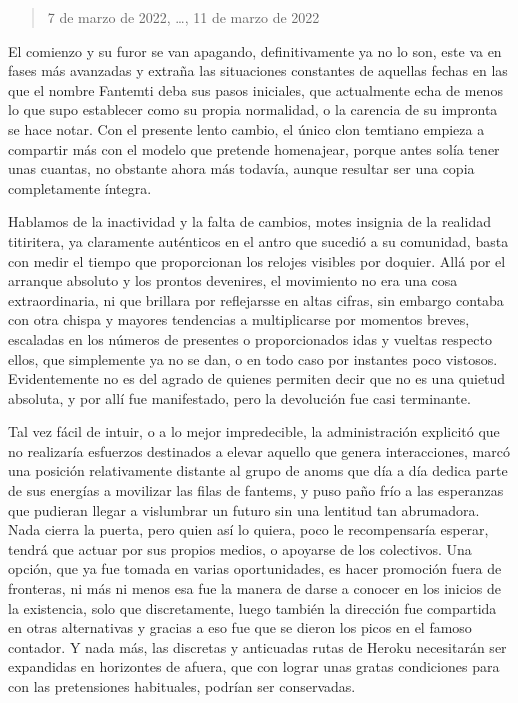 \documentclass[
]{book}
\begin{document}
\begin{quote}
7 de marzo de 2022, \ldots, 11 de marzo de 2022
\end{quote}

El comienzo y su furor se van apagando, definitivamente ya no lo son, este va en fases más avanzadas y extraña las situaciones constantes de aquellas fechas en las que el nombre Fantemti deba sus pasos iniciales, que actualmente echa de menos lo que supo establecer como su propia normalidad, o la carencia de su impronta se hace notar. Con el presente lento cambio, el único clon temtiano empieza a compartir más con el modelo que pretende homenajear, porque antes solía tener unas cuantas, no obstante ahora más todavía, aunque resultar ser una copia completamente íntegra.

Hablamos de la inactividad y la falta de cambios, motes insignia de la realidad titiritera, ya claramente auténticos en el antro que sucedió a su comunidad, basta con medir el tiempo que proporcionan los relojes visibles por doquier. Allá por el arranque absoluto y los prontos devenires, el movimiento no era una cosa extraordinaria, ni que brillara por reflejarsse en altas cifras, sin embargo contaba con otra chispa y mayores tendencias a multiplicarse por momentos breves, escaladas en los números de presentes o proporcionados idas y vueltas respecto ellos, que simplemente ya no se dan, o en todo caso por instantes poco vistosos. Evidentemente no es del agrado de quienes permiten decir que no es una quietud absoluta, y por allí fue manifestado, pero la devolución fue casi terminante.

Tal vez fácil de intuir, o a lo mejor impredecible, la administración explicitó que no realizaría esfuerzos destinados a elevar aquello que genera interacciones, marcó una posición relativamente distante al grupo de anoms que día a día dedica parte de sus energías a movilizar las filas de fantems, y puso paño frío a las esperanzas que pudieran llegar a vislumbrar un futuro sin una lentitud tan abrumadora. Nada cierra la puerta, pero quien así lo quiera, poco le recompensaría esperar, tendrá que actuar por sus propios medios, o apoyarse de los colectivos. Una opción, que ya fue tomada en varias oportunidades, es hacer promoción fuera de fronteras, ni más ni menos esa fue la manera de darse a conocer en los inicios de la existencia, solo que discretamente, luego también la dirección fue compartida en otras alternativas y gracias a eso fue que se dieron los picos en el famoso contador. Y nada más, las discretas y anticuadas rutas de Heroku necesitarán ser expandidas en horizontes de afuera, que con lograr unas gratas condiciones para con las pretensiones habituales, podrían ser conservadas.
\end{document}
